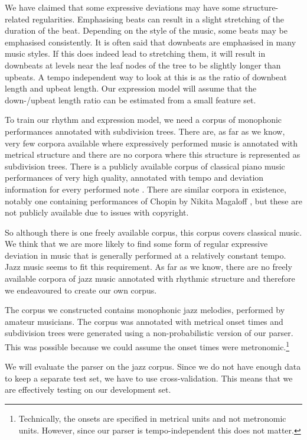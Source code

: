 We have claimed that some expressive deviations may have some structure-related regularities. Emphasising beats can result in a slight stretching of the duration of the beat. Depending on the style of the music, some beats may be emphasised consistently. It is often said that downbeats are emphasised in many music styles. If this does indeed lead to stretching them, it will result in downbeats at levels near the leaf nodes of the tree to be slightly longer than upbeats. A tempo independent way to look at this is as the ratio of downbeat length and upbeat length. Our expression model will assume that the down-/upbeat length ratio can be estimated from a small feature set.

To train our rhythm and expression model, we need a corpus of monophonic performances annotated with subdivision trees. There are, as far as we know, very few corpora available where expressively performed music is annotated with metrical structure and there are no corpora where this structure is represented as subdivision trees. There is a publicly available corpus of classical piano music performances of very high quality, annotated with tempo and deviation information for every performed note \citep{hashida2008new}. There are similar corpora in existence, notably one containing performances of Chopin by Nikita Magaloff \citep{flossmann2010magaloff}, but these are not publicly available due to issues with copyright. 

So although there is one freely available corpus, this corpus covers classical music. We think that we are more likely to find some form of regular expressive deviation in music that is generally performed at a relatively constant tempo. Jazz music seems to fit this requirement. As far as we know, there are no freely available corpora of jazz music annotated with rhythmic structure and therefore we endeavoured to create our own corpus.

The corpus we constructed contains monophonic jazz melodies, performed by amateur musicians. The corpus was annotated with metrical onset times and subdivision trees were generated using a non-probabilistic version of our parser. This was possible because we could assume the onset times were metronomic.\footnote{Technically, the onsets are specified in metrical units and not metronomic units. However, since our parser is tempo-independent this does not matter.}

We will evaluate the parser on the jazz corpus. Since we do not have enough data to keep a separate test set, we have to use cross-validation. This means that we are effectively testing on our development set.
